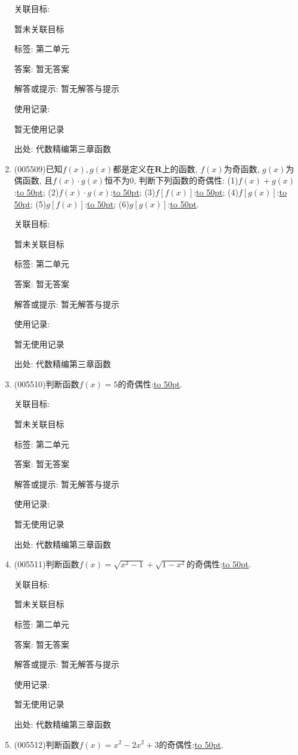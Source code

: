 \documentclass[10pt,a4paper]{article}
\newcommand{\blank}[1]{\underline{\hbox to #1pt{}}}
\begin{document}
\begin{enumerate}[1.]
关联目标:

暂未关联目标



标签: 第二单元

答案: 暂无答案

解答或提示: 暂无解答与提示

使用记录:

暂无使用记录


出处: 代数精编第三章函数
\item { (005509)}已知$f(x),g(x)$都是定义在$\mathbf{R}$上的函数, $f(x)$为奇函数, $g(x)$为偶函数, 且$f(x)\cdot g(x)$恒不为$0$, 判断下列函数的奇偶性:
(1)$f(x)+g(x)$:\blank{50}; (2)$f(x)\cdot g(x)$:\blank{50}; (3)$f[f(x)]$:\blank{50}; (4)$f[g(x)]$:\blank{50}; (5)$g[f(x)]$:\blank{50}; (6)$g[g(x)]$:\blank{50}.


关联目标:

暂未关联目标



标签: 第二单元

答案: 暂无答案

解答或提示: 暂无解答与提示

使用记录:

暂无使用记录


出处: 代数精编第三章函数
\item { (005510)}判断函数$f(x)=5$的奇偶性:\blank{50}.


关联目标:

暂未关联目标



标签: 第二单元

答案: 暂无答案

解答或提示: 暂无解答与提示

使用记录:

暂无使用记录


出处: 代数精编第三章函数
\item { (005511)}判断函数$f(x)=\sqrt {x^2-1}+\sqrt {1-x^2}$的奇偶性:\blank{50}.


关联目标:

暂未关联目标



标签: 第二单元

答案: 暂无答案

解答或提示: 暂无解答与提示

使用记录:

暂无使用记录


出处: 代数精编第三章函数
\item { (005512)}判断函数$f(x)=x^2-2x^2+3$的奇偶性:\blank{50}.



\end{enumerate}
\end{document}
